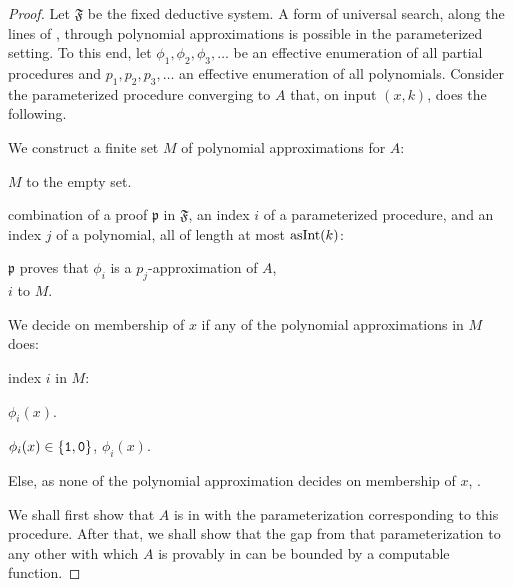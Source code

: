 \begin{proof}
  Let $\mathfrak{F}$ be the fixed deductive system.
  A form of universal search, along the lines of \textcite{hutter2002fastest}, through polynomial approximations is possible in the parameterized setting.
  To this end, let $\phi_1, \phi_2, \phi_3, \ldots$ be an effective enumeration of all partial procedures and $p_1, p_2, p_3, \ldots$ an effective enumeration of all polynomials.
  Consider the parameterized procedure converging to $A$ that, on input $(x, k)$, does the following.
  \begin{codelisting}
  \item
    We construct a finite set $M$ of polynomial approximations for $A$:
    \begin{codelisting}
    \item
       $M$ to the empty set.
    \item
       combination of a proof $\mathfrak{p}$ in $\mathfrak{F}$, an index $i$ of a parameterized procedure, and an index $j$ of a polynomial, all of length at most $\asNat(k)$:
      \begin{codelisting}
      \item\label{alg:xpprincipal:approximations}
         $\mathfrak{p}$ proves that $\phi_i$ is a $p_j$-approximation of $A$,
        \\\-\quad {} $i$ to $M$.
      \end{codelisting}
    \end{codelisting}
  \item
    We decide on membership of $x$ if any of the polynomial approximations in $M$ does:
    \begin{codelisting}
    \item
       index $i$ in $M$:
      \begin{codelisting}
      \item
         $\phi_i(x)$.
      \item
         $\phi_i(x) \in \{\bits{1}, \bits{0}\}$,  $\phi_i(x)$.
      \end{codelisting}
    \item
      Else, as none of the polynomial approximation decides on membership of $x$,  .
    \end{codelisting}
  \end{codelisting}

  We shall first show that $A$ is in  with the parameterization corresponding to this procedure.
  After that, we shall show that the gap from that parameterization to any other with which $A$ is provably in  can be bounded by a computable function.


\end{proof}
